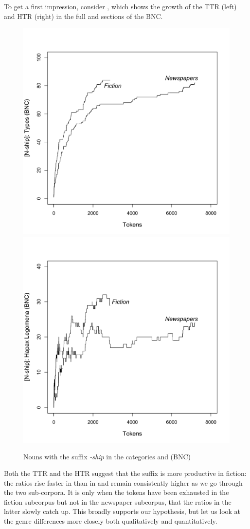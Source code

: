 To get a first impression, consider , which shows the growth of the TTR (left) and HTR  (right) in the full  and   sections of the  BNC.

\begin{figure}
\caption{Nouns with the suffix \textit{-ship} in the  categories  and  (BNC)\label{fig:genreshipfullttrhtr}}
\includegraphics[width=.5\linewidth]{figures/genreshipfullttr}%
\includegraphics[width=.5\linewidth]{figures/genreshipfullhtr}%
\end{figure}

Both the TTR  and the HTR  suggest that the suffix  is more productive  in fiction:  the ratios rise faster in  than in   and remain consistently higher as we go through the two sub\hyp{}corpora. It is only when the tokens have been exhausted in the fiction subcorpus but not in the newspaper subcorpus, that the ratios in the latter slowly catch up. This broadly supports our hypothesis, but let us look at the genre  differences more closely both qualitatively  and  quantitatively.

